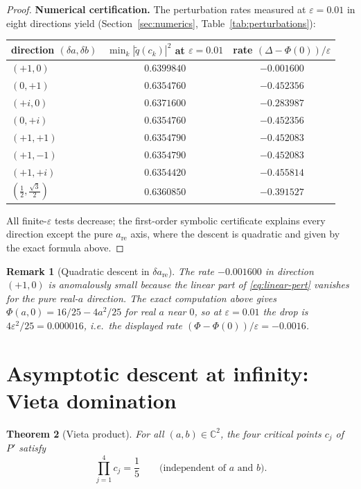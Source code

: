 \documentclass[11pt,a4paper]{article}
\newtheorem{theorem}{Theorem}[section]
\newtheorem{remark}[theorem]{Remark}
\begin{document}
\begin{proof}
\textbf{Numerical certification.} The perturbation rates measured at $\varepsilon = 0.01$ in eight directions yield (Section~\ref{sec:numerics}, Table~\ref{tab:perturbations}):
\begin{center}
\begin{tabular}{lcc}
\toprule
direction $(\delta a, \delta b)$ & $\min_k |\tilde{q}(c_k)|^2$ at $\varepsilon = 0.01$ & rate $(\Delta - \Phi(0))/\varepsilon$ \\
\midrule
$(+1, 0)$ & $0.6399840$ & $-0.001600$ \\
$(0, +1)$ & $0.6354760$ & $-0.452356$ \\
$(+i, 0)$ & $0.6371600$ & $-0.283987$ \\
$(0, +i)$ & $0.6354760$ & $-0.452356$ \\
$(+1, +1)$ & $0.6354790$ & $-0.452083$ \\
$(+1, -1)$ & $0.6354790$ & $-0.452083$ \\
$(+1, +i)$ & $0.6354420$ & $-0.455814$ \\
$(\tfrac{1}{2}, \tfrac{\sqrt{3}}{2})$ & $0.6360850$ & $-0.391527$ \\
\bottomrule
\end{tabular}
\end{center}
All finite-$\varepsilon$ tests decrease; the first-order symbolic certificate
explains every direction except the pure $a_{\mathrm{re}}$ axis, where the
descent is quadratic and given by the exact formula above.
\end{proof}

\begin{remark}[Quadratic descent in $\delta a_{\mathrm{re}}$]
The rate $-0.001600$ in direction $(+1, 0)$ is anomalously small because the linear part of \eqref{eq:linear-pert} vanishes for the pure real-$a$ direction. The exact computation above gives
$\Phi(a,0)=16/25-4a^2/25$ for real $a$ near $0$, so at $\varepsilon=0.01$ the drop is $4\varepsilon^2/25=0.000016$, i.e.\ the displayed rate $(\Phi-\Phi(0))/\varepsilon=-0.0016$.
\end{remark}

\section{Asymptotic descent at infinity: Vieta domination}

\begin{theorem}[Vieta product]\label{thm:vieta}
For all $(a, b) \in \mathbb{C}^2$, the four critical points $c_j$ of $P'$ satisfy
\begin{equation}
\prod_{j=1}^4 c_j = \frac{1}{5} \qquad \text{(independent of $a$ and $b$).}
\end{equation}
\end{theorem}
\end{document}
